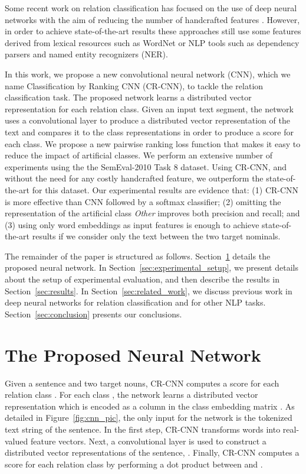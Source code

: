 \documentclass[11pt]{article}
\begin{document}
Some recent work on relation classification has focused on the use of deep neural networks with the aim of reducing the number of handcrafted features \cite{socher:2012:emnlp,zeng2014:coling,yu2014}. 
However,
in order to achieve state-of-the-art results these approaches still use some features derived from lexical resources such as WordNet or NLP tools such as dependency parsers and named entity recognizers (NER). 

In this work, 
we propose a new convolutional neural network (CNN), 
which we name Classification by Ranking CNN (CR-CNN), to tackle the relation classification task.
The proposed network learns a distributed vector representation for each relation class.
Given an input text segment,
the network uses a convolutional layer to produce a distributed vector representation of the text and compares it to the class representations in order to produce a score for each class.
We propose a new pairwise ranking loss function that makes it easy to reduce the impact of artificial classes.
We perform an extensive number of experiments using the the SemEval-2010 Task 8 dataset.
Using CR-CNN, and without the need for any costly handcrafted feature,
we outperform the state-of-the-art for this dataset.
Our experimental results are evidence that: 
(1) CR-CNN is more effective than CNN followed by a softmax classifier;
(2) omitting the representation of the artificial class \emph{Other} improves both precision and recall; and 
(3) using only word embeddings as input features is enough to achieve state-of-the-art results if we consider only the text between the two target nominals.

The remainder of the paper is structured as follows. Section~\ref{sec:neuralnetwork} details the proposed neural network. 
In Section~\ref{sec:experimental_setup}, 
we present details about the setup of experimental evaluation, 
and then describe the results in Section~\ref{sec:results}. 
In Section~\ref{sec:related_work}, 
we discuss previous work in deep neural networks for relation classification and for other NLP tasks. Section~\ref{sec:conclusion} presents our conclusions. \section{The Proposed Neural Network}
\label{sec:neuralnetwork}
Given a sentence  and two target nouns,
CR-CNN computes a score for each relation class .
For each class ,
the network learns a distributed vector representation which is encoded as a column in the class embedding matrix .
As detailed in Figure~\ref{fig:cnn_pic},
the only input for the network is the tokenized text string of the sentence.
In the first step,
CR-CNN transforms words into real-valued feature vectors.
Next,
a convolutional layer is used to construct a distributed vector representations of the sentence, .
Finally,
CR-CNN computes a score for each relation class  by performing a dot product between  and .
\end{document}
